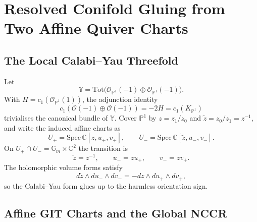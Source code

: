 \section{Resolved Conifold Gluing from Two Affine Quiver Charts}
\label{wn:conifold-quiver-gluing}

\providecommand{\CoHA}{\mathrm{CoHA}}
\providecommand{\Eone}{E_1}
\providecommand{\Etwo}{E_2}
\providecommand{\Ethree}{E_3}
\providecommand{\hCS}{\mathrm{hCS}}
\providecommand{\PV}{\mathrm{PV}}
\providecommand{\Crit}{\mathrm{Crit}}
\providecommand{\bY}{\mathbb{Y}}
\providecommand{\cF}{\mathcal{F}}
\providecommand{\cO}{\mathcal{O}}
\providecommand{\cU}{\mathcal{U}}
\providecommand{\HH}{\mathrm{HH}}
\providecommand{\Gm}{\mathbb{G}_m}
\providecommand{\PhiFA}{\Phi^{\mathrm{FA}}}
\providecommand{\kch}{\kappa_{\mathrm{ch}}}
\providecommand{\kcat}{\kappa_{\mathrm{cat}}}
\providecommand{\kBKM}{\kappa_{\mathrm{BKM}}}
\providecommand{\kfib}{\kappa_{\mathrm{fiber}}}

\subsection*{The Local Calabi--Yau Threefold}

Let
\[
  \bY=\mathrm{Tot}\bigl(\cO_{\mathbb P^1}(-1)\oplus
  \cO_{\mathbb P^1}(-1)\bigr).
\]
With $H=c_1(\cO_{\mathbb P^1}(1))$, the adjunction identity
\[
  c_1(\cO(-1)\oplus\cO(-1))=-2H=c_1(K_{\mathbb P^1})
\]
trivialises the canonical bundle of $\bY$. Cover $\mathbb P^1$ by
$z=z_1/z_0$ and $\tilde z=z_0/z_1=z^{-1}$, and write the induced affine
charts as
\[
  U_+=\mathrm{Spec}\,\mathbb C[z,u_+,v_+],\qquad
  U_-=\mathrm{Spec}\,\mathbb C[\tilde z,u_-,v_-].
\]
On $U_+\cap U_-=\Gm\times\mathbb C^2$ the transition is
\[
  \tilde z=z^{-1},\qquad u_-=zu_+,\qquad v_-=zv_+.
\]
The holomorphic volume forms satisfy
\[
  d\tilde z\wedge du_-\wedge dv_-=-dz\wedge du_+\wedge dv_+,
\]
so the Calabi--Yau form glues up to the harmless orientation sign.

\subsection*{Affine GIT Charts and the Global NCCR}

